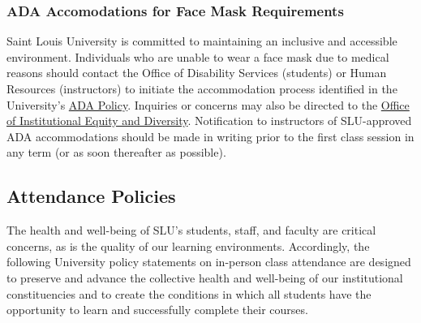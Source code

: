 \documentclass[
]{book}
\begin{document}
\hypertarget{ada-accomodations-for-face-mask-requirements}{%
\subsubsection{ADA Accomodations for Face Mask Requirements}\label{ada-accomodations-for-face-mask-requirements}}

Saint Louis University is committed to maintaining an inclusive and accessible environment. Individuals who are unable to wear a face mask due to medical reasons should contact the Office of Disability Services (students) or Human Resources (instructors) to initiate the accommodation process identified in the University's \href{https://www.slu.edu/human-resources/pdfs/policies/americans-disabilities-act-policy.pdf}{ADA Policy}. Inquiries or concerns may also be directed to the \href{https://www.slu.edu/general-counsel/institutional-equity-diversity/index.php}{Office of Institutional Equity and Diversity}. Notification to instructors of SLU-approved ADA accommodations should be made in writing prior to the first class session in any term (or as soon thereafter as possible).

\hypertarget{attendance-policies}{%
\subsection{Attendance Policies}\label{attendance-policies}}

The health and well-being of SLU's students, staff, and faculty are critical concerns, as is the quality of our learning environments. Accordingly, the following University policy statements on in-person class attendance are designed to preserve and advance the collective health and well-being of our institutional constituencies and to create the conditions in which all students have the opportunity to learn and successfully complete their courses.
\end{document}
